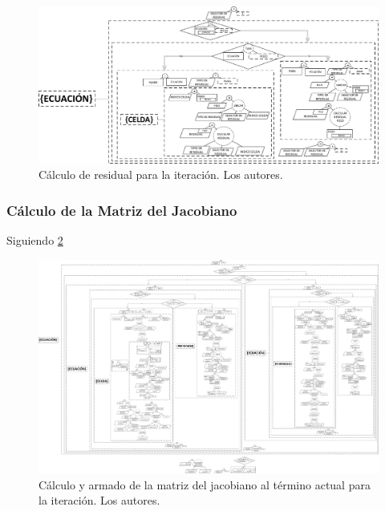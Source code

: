 \begin{figure}[h]
	\centering%
	\includegraphics[width=\linewidth]{Fig/Residual.pdf}%
	\caption[Cálculo de residual para la iteración.]{Cálculo de residual para la iteración. Los autores.} \label{fig:Residual}
\end{figure}

\subsubsection{Cálculo de la Matriz del Jacobiano}\label{subsec:Jacobian}
Siguiendo \ref{fig:Jacobiano} \\ %

\begin{figure}[h]
	\centering%
	\includegraphics[width=\linewidth]{Fig/Jacobiano.pdf}%
	\caption[Cálculo y armado de la matriz del jacobiano al término actual para la iteración.]{Cálculo y armado de la matriz del jacobiano al término actual para la iteración. Los autores.} \label{fig:Jacobiano}
\end{figure}

